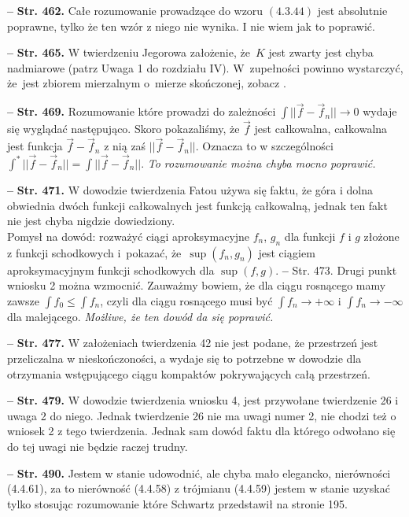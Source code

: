 \documentclass[a4paper]{article}
\newcommand{\ra}{\rightarrow}
\newcommand{\tb}{\textbf}
\newcommand{\noi}{\noindent}
\newcommand{\start}{\noi \tb{--} {}}
\newcommand{\Str}[1]{\tb{Str. #1.}}
\begin{document}
\start \Str{462} Całe rozumowanie prowadzące do wzoru $(4.3.44)$ jest
absolutnie poprawne, tylko że ten wzór z niego nie wynika. I nie wiem
jak to poprawić.

\start \Str{465} W twierdzeniu Jegorowa założenie, że~$K$ jest zwarty
jest chyba nadmiarowe (patrz Uwaga 1 do rozdziału IV). W~zupełności
powinno wystarczyć, że~jest zbiorem mierzalnym o~mierze skończonej,
zobacz \cite{Rud86}.

\start \Str{469} Rozumowanie które prowadzi do zależności
$\int || \vec{ f } - \vec{ f }_{ n } || \rightarrow 0$ wydaje się
wyglądać następująco. Skoro pokazaliśmy, że $\vec{ f }$ jest
całkowalna, całkowalna jest funkcja $\vec{ f } - \vec{ f }_{ n }$ z
nią zaś $|| \vec{ f } - \vec{ f }_{ n } ||$. Oznacza to w
szczególności
$\int^{ * } || \vec{ f } - \vec{ f }_{ n } || = \int || \vec{ f } -
\vec{ f }_{ n } ||$. \emph{To rozumowanie można chyba mocno poprawić.}

\start \Str{471} W dowodzie twierdzenia Fatou używa się faktu, że góra
i dolna obwiednia dwóch funkcji całkowalnych jest funkcją
całkowalną, jednak ten fakt nie jest chyba nigdzie dowiedziony.\\
Pomysł na dowód: rozważyć ciągi aproksymacyjne $f_{ n }$, $g_{ n }$
dla funkcji $f$ i $g$ złożone z funkcji schodkowych i~pokazać,
że~$\sup( f_{ n }, g_{ n } )$ jest ciągiem aproksymacyjnym funkcji
schodkowych dla $\sup( f, g )$. \start Str. 473. Drugi punkt wniosku 2
można wzmocnić. Zauważmy bowiem, że dla ciągu rosnącego mamy zawsze
$\int f_{ 0 } \leq \int f_{ n }$, czyli dla ciągu rosnącego musi być
$\int f_{ n } \ra +\infty$ i $\int f_{ n } \ra -\infty$ dla
malejącego. \emph{Możliwe, że ten dowód da się poprawić.}

\start \Str{477} W założeniach twierdzenia 42 nie jest podane, że
przestrzeń jest przeliczalna w nieskończoności, a wydaje się to
potrzebne w dowodzie dla otrzymania wstępującego ciągu kompaktów
pokrywających całą przestrzeń.

\start \Str{479} W dowodzie twierdzenia wniosku 4, jest przywołane
twierdzenie 26 i uwaga 2 do niego. Jednak twierdzenie 26 nie ma uwagi
numer 2, nie chodzi też o wniosek 2 z tego twierdzenia. Jednak sam
dowód faktu dla którego odwołano się do tej uwagi nie będzie raczej
trudny.

\start \Str{490} Jestem w stanie udowodnić, ale chyba mało elegancko,
nierówności (4.4.61), za to nierówność (4.4.58) z trójmianu (4.4.59)
jestem w stanie uzyskać tylko stosując rozumowanie które Schwartz
przedstawił na stronie 195.
\end{document}
